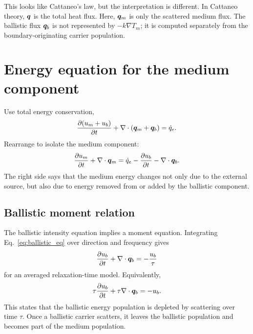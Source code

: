 \documentclass[11pt]{article}
\begin{document}
This looks like Cattaneo's law, but the interpretation is different. In Cattaneo theory, \(\bm{q}\) is the total heat flux. Here, \(\bm{q}_m\) is only the scattered medium flux. The ballistic flux \(\bm{q}_b\) is not represented by \(-k\nabla T_m\); it is computed separately from the boundary-originating carrier population.

\section{Energy equation for the medium component}
Use total energy conservation,
\begin{equation}
    \frac{\partial (u_m+u_b)}{\partial t}+\nabla\cdot(\bm{q}_m+\bm{q}_b)=\dot{q}_e.
\end{equation}
Rearrange to isolate the medium component:
\begin{equation}
    \frac{\partial u_m}{\partial t}+\nabla\cdot\bm{q}_m
    =\dot{q}_e-\frac{\partial u_b}{\partial t}-\nabla\cdot\bm{q}_b.
    \label{eq:medium_energy_balance}
\end{equation}
The right side says that the medium energy changes not only due to the external source, but also due to energy removed from or added by the ballistic component.

\subsection{Ballistic moment relation}
The ballistic intensity equation implies a moment equation. Integrating Eq.~\eqref{eq:ballistic_eq} over direction and frequency gives
\begin{equation}
    \frac{\partial u_b}{\partial t}+\nabla\cdot\bm{q}_b=-\frac{u_b}{\tau}
    \label{eq:ballistic_moment_unmultiplied}
\end{equation}
for an averaged relaxation-time model. Equivalently,
\begin{equation}
    \tau\frac{\partial u_b}{\partial t}+\tau\nabla\cdot\bm{q}_b=-u_b.
    \label{eq:ballistic_moment}
\end{equation}
This states that the ballistic energy population is depleted by scattering over time \(\tau\). Once a ballistic carrier scatters, it leaves the ballistic population and becomes part of the medium population.
\end{document}

